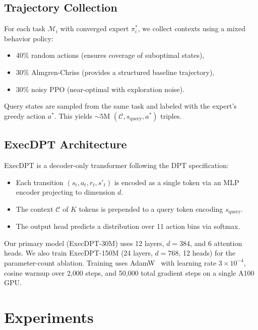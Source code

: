\documentclass[sigconf,review,anonymous]{acmart}
\newcommand{\calM}{\mathcal{M}}
\newcommand{\calC}{\mathcal{C}}
\begin{document}
\subsection{Trajectory Collection}

For each task $\calM_i$ with converged expert $\pi^*_i$, we collect contexts using a mixed behavior policy:
\begin{itemize}
    \item 40\% random actions (ensures coverage of suboptimal states),
    \item 30\% Almgren-Chriss (provides a structured baseline trajectory),
    \item 30\% noisy PPO (near-optimal with exploration noise).
\end{itemize}
Query states are sampled from the same task and labeled with the expert's greedy action $a^*$.
This yields ${\sim}5$M $(\calC, s_{\text{query}}, a^*)$ triples.

\subsection{ExecDPT Architecture}

ExecDPT is a decoder-only transformer following the DPT specification:
\begin{itemize}
    \item Each transition $(s_t, a_t, r_t, s'_t)$ is encoded as a single token via an MLP encoder projecting to dimension $d$.
    \item The context $\calC$ of $K$ tokens is prepended to a query token encoding $s_{\text{query}}$.
    \item The output head predicts a distribution over 11 action bins via softmax.
\end{itemize}

Our primary model (ExecDPT-30M) uses 12 layers, $d = 384$, and 6 attention heads.
We also train ExecDPT-150M (24 layers, $d = 768$, 12 heads) for the parameter-count ablation.
Training uses AdamW~\cite{loshchilov2018decoupled} with learning rate $3 \times 10^{-4}$, cosine warmup over 2{,}000 steps, and 50{,}000 total gradient steps on a single A100 GPU.


\section{Experiments}\label{sec:experiments}
\end{document}
